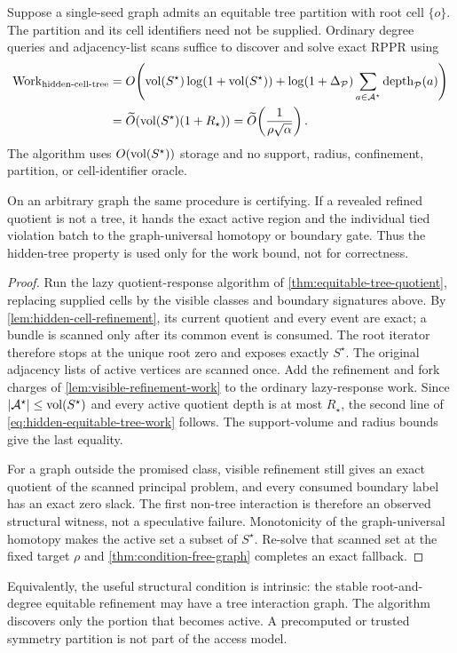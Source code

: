 \begin{theorem}
\label{thm:hidden-equitable-tree-quotient}
Suppose a single-seed graph admits an equitable tree partition with root cell
$\{o\}$.  The partition and its cell identifiers need not be supplied.
Ordinary degree queries and adjacency-list scans suffice to discover and
solve exact RPPR using
\begin{align}
 \operatorname{Work}_{\rm hidden\text{-}cell\text{-}tree}
 &=O\!\left(
   \operatorname{vol}(S^\star)\log(1+\operatorname{vol}(S^\star))
   +\log(1+\Delta_{\mathcal P})
    \sum_{a\in\mathcal A^\star}
    \operatorname{depth}_{\mathcal P}(a)
  \right)
 \notag\\
 &=\widetilde O\!\left(
   \operatorname{vol}(S^\star)(1+R_\star)
  \right)
 =\widetilde O\!\left(\frac1{\rho\sqrt\alpha}\right).
 \label{eq:hidden-equitable-tree-work}
\end{align}
The algorithm uses $O(\operatorname{vol}(S^\star))$ storage and no support, radius,
confinement, partition, or cell-identifier oracle.

On an arbitrary graph the same procedure is certifying.  If a revealed
refined quotient is not a tree, it hands the exact active region and the
individual tied violation batch to the graph-universal homotopy or boundary
gate.  Thus the hidden-tree property is used only for the work bound, not for
correctness.
\end{theorem}

\begin{proof}
Run the lazy quotient-response algorithm of
\cref{thm:equitable-tree-quotient}, replacing supplied cells by the visible
classes and boundary signatures above.  By
\cref{lem:hidden-cell-refinement}, its current quotient and every event are
exact; a bundle is scanned only after its common event is consumed.  The
root iterator therefore stops at the unique root zero and exposes exactly
$S^\star$.  The original adjacency lists of active vertices are scanned once.
Add the refinement and fork charges of
\cref{lem:visible-refinement-work} to the ordinary lazy-response work.  Since
$|\mathcal A^\star|\leq\operatorname{vol}(S^\star)$ and every active quotient depth is at
most $R_\star$, the second line of
\cref{eq:hidden-equitable-tree-work} follows.  The support-volume and radius
bounds give the last equality.

For a graph outside the promised class, visible refinement still gives an
exact quotient of the scanned principal problem, and every consumed boundary
label has an exact zero slack.  The first non-tree interaction is therefore
an observed structural witness, not a speculative failure.  Monotonicity of
the graph-universal homotopy makes the active set a subset of $S^\star$.
Re-solve that scanned set at the fixed target $\rho$ and
\cref{thm:condition-free-graph} completes an exact fallback.
\end{proof}

Equivalently, the useful structural condition is intrinsic: the stable
root-and-degree equitable refinement may have a tree interaction graph.  The
algorithm discovers only the portion that becomes active.  A precomputed or
trusted symmetry partition is not part of the access model.

